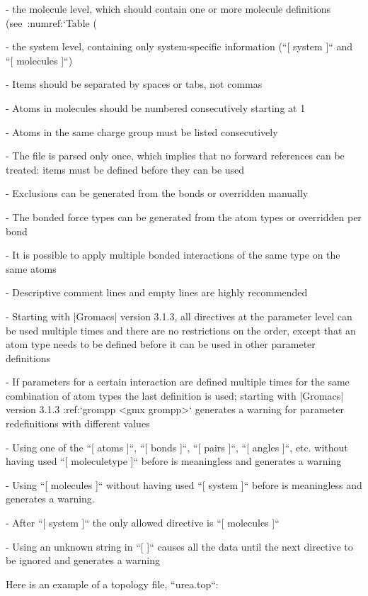    -  the molecule level, which should contain one or more molecule
      definitions (see :numref:`Table (%

   -  the system level, containing only system-specific information
      (``[ system ]`` and ``[ molecules ]``)

-  Items should be separated by spaces or tabs, not commas

-  Atoms in molecules should be numbered consecutively starting at 1

-  Atoms in the same charge group must be listed consecutively

-  The file is parsed only once, which implies that no forward
   references can be treated: items must be defined before they can be
   used

-  Exclusions can be generated from the bonds or overridden manually

-  The bonded force types can be generated from the atom types or
   overridden per bond

-  It is possible to apply multiple bonded interactions of the same type
   on the same atoms

-  Descriptive comment lines and empty lines are highly recommended

-  Starting with |Gromacs| version 3.1.3, all directives at the parameter
   level can be used multiple times and there are no restrictions on the
   order, except that an atom type needs to be defined before it can be
   used in other parameter definitions

-  If parameters for a certain interaction are defined multiple times
   for the same combination of atom types the last definition is used;
   starting with |Gromacs| version 3.1.3 :ref:`grompp <gmx grompp>` generates
   a warning for parameter redefinitions with different values

-  Using one of the ``[ atoms ]``,
   ``[ bonds ]``, ``[ pairs ]``,
   ``[ angles ]``, etc. without having used
   ``[ moleculetype ]`` before is meaningless and generates
   a warning

-  Using ``[ molecules ]`` without having used
   ``[ system ]`` before is meaningless and generates a
   warning.

-  After ``[ system ]`` the only allowed directive is
   ``[ molecules ]``

-  Using an unknown string in ``[ ]`` causes all the data
   until the next directive to be ignored and generates a warning

Here is an example of a topology file, ``urea.top``:

